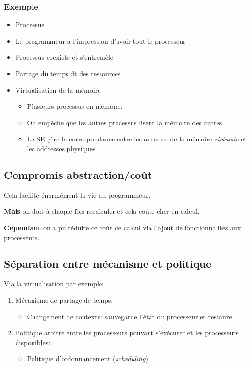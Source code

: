 \subsubsection{Exemple}\label{exemple}

\begin{itemize}
\tightlist
\item
  Processus
\item
  Le programmeur a l'impression d'avoir tout le processeur
\item
  Processus coexiste et s'entremêle
\item
  Partage du temps dt des ressources
\item
  Virtualisation de la mémoire

  \begin{itemize}
  \tightlist
  \item
    Plusieurs processus en mémoire.
  \item
    On empêche que les autres processus lisent la mémoire des autres
  \item
    Le SE gère la correspondance entre les adresses de la mémoire
    \emph{virtuelle} et les addresses physiques
  \end{itemize}
\end{itemize}

\subsection{Compromis
abstraction/coût}\label{compromis-abstractioncouxfbt}

Cela facilite énormément la vie du programmeur.

\textbf{Mais} on doit à chaque fois recalculer et cela coûte cher en
calcul.

\textbf{Cependant} on a pu réduire ce coût de calcul via l'ajout de
fonctionnalités aux processeurs.

\subsection{Séparation entre mécanisme et
politique}\label{suxe9paration-entre-muxe9canisme-et-politique}

Via la virtualisation par exemple:

\begin{enumerate}
\def\labelenumi{\arabic{enumi}.}
\tightlist
\item
  Mécanisme de partage de temps:

  \begin{itemize}
  \tightlist
  \item
    Changement de contexte: sauvegarde l'état du processeur et restaure
  \end{itemize}
\item
  Politique arbitre entre les processeurs pouvant s'exécuter et les
  processeurs disponibles:

  \begin{itemize}
  \tightlist
  \item
    Politique d'ordonnancement (\emph{scheduling})
  \end{itemize}
\end{enumerate}

